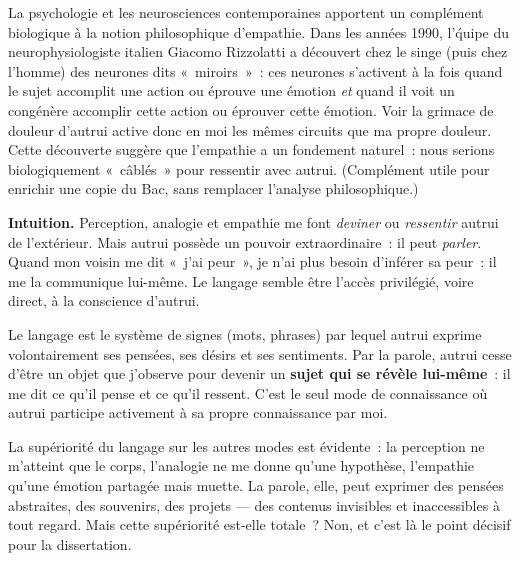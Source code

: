 \documentclass[11pt]{article}
\newcommand{\cle}[1]{{\popxbold\color{popdark}#1}}
\newcounter{popsec}
\newcounter{popsub}
\newcommand{\courssub}[1]{%
  \stepcounter{popsub}%
  \par\vspace{9pt}\noindent{\popxbold\fontsize{11.5}{13}\selectfont\color{popink}{\color{poporange}\thepopsec.\thepopsub}\hspace{6pt}#1}\par\nopagebreak\vspace{4pt}
}
\begin{document}
\begin{savaistu}
La psychologie et les neurosciences contemporaines apportent un compl\'ement biologique \`a la notion philosophique d'empathie. Dans les ann\'ees 1990, l'\'quipe du neurophysiologiste italien Giacomo Rizzolatti a d\'ecouvert chez le singe (puis chez l'homme) des neurones dits «~\cle{miroirs}~»~: ces neurones s'activent \`a la fois quand le sujet accomplit une action ou \'eprouve une \'emotion \emph{et} quand il voit un cong\'en\`ere accomplir cette action ou \'eprouver cette \'emotion. Voir la grimace de douleur d'autrui active donc en moi les m\^emes circuits que ma propre douleur. Cette d\'ecouverte sugg\`ere que l'empathie a un fondement naturel~: nous serions biologiquement «~c\^abl\'es~» pour ressentir avec autrui. (Compl\'ement utile pour enrichir une copie du Bac, sans remplacer l'analyse philosophique.)
\end{savaistu}

\courssub{Le langage~: autrui me dit ce qu'il pense}

\textbf{Intuition.} Perception, analogie et empathie me font \emph{deviner} ou \emph{ressentir} autrui de l'ext\'erieur. Mais autrui poss\`ede un pouvoir extraordinaire~: il peut \emph{parler}. Quand mon voisin me dit «~j'ai peur~», je n'ai plus besoin d'inf\'erer sa peur~: il me la communique lui-m\^eme. Le langage semble \^etre l'acc\`es privil\'egi\'e, voire direct, \`a la conscience d'autrui.

\begin{definition}
Le \cle{langage} est le syst\`eme de signes (mots, phrases) par lequel autrui exprime volontairement ses pens\'ees, ses d\'esirs et ses sentiments. Par la parole, autrui cesse d'\^etre un objet que j'observe pour devenir un \textbf{sujet qui se r\'ev\`ele lui-m\^eme}~: il me dit ce qu'il pense et ce qu'il ressent. C'est le seul mode de connaissance o\`u autrui participe activement \`a sa propre connaissance par moi.
\end{definition}

La sup\'eriorit\'e du langage sur les autres modes est \'evidente~: la perception ne m'atteint que le corps, l'analogie ne me donne qu'une hypoth\`ese, l'empathie qu'une \'emotion partag\'ee mais muette. La parole, elle, peut exprimer des pens\'ees abstraites, des souvenirs, des projets --- des contenus invisibles et inaccessibles \`a tout regard. Mais cette sup\'eriorit\'e est-elle totale~? Non, et c'est l\`a le point d\'ecisif pour la dissertation.
\end{document}
